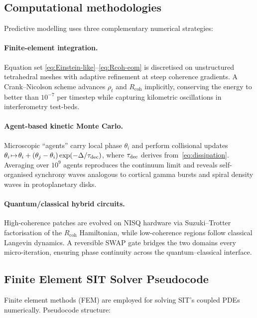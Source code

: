 \documentclass[american,11pt,letterpaper]{article}
\begin{document}
\subsection*{Computational methodologies}

Predictive modelling uses three complementary numerical strategies:  

\paragraph{Finite-element integration.}
Equation set \eqref{eq:Einstein-like}--\eqref{eq:Rcoh-eom} is discretised on unstructured tetrahedral meshes with adaptive refinement at steep coherence gradients.  A Crank--Nicolson scheme advances $\rho_{t}$ and $R_{\text{coh}}$ implicitly, conserving the energy to better than $10^{-7}$ per timestep while capturing kilometric oscillations in interferometry test-beds.

\paragraph{Agent-based kinetic Monte Carlo.}
Microscopic ``agents'' carry local phase $\theta_{i}$ and perform collisional updates
$\theta_{i}\!\mapsto\!\theta_{i}+(\theta_{j}-\theta_{i})\exp(-\Delta/\tau_{\rm dec})$,
where $\tau_{\rm dec}$ derives from~\eqref{eq:dissipation}.  Averaging over $10^{9}$ agents reproduces the continuum limit and reveals self-organised synchrony waves analogous to cortical gamma bursts and spiral density waves in protoplanetary disks.

\paragraph{Quantum/classical hybrid circuits.}
High-coherence patches are evolved on NISQ hardware via Suzuki--Trotter factorisation of the $R_{\text{coh}}$ Hamiltonian, while low-coherence regions follow classical Langevin dynamics.  A reversible SWAP gate bridges the two domains every micro-iteration, ensuring phase continuity across the quantum--classical interface.

\subsection{Finite Element SIT Solver Pseudocode}

Finite element methods (FEM) are employed for solving SIT's coupled PDEs numerically. Pseudocode structure:
\end{document}
